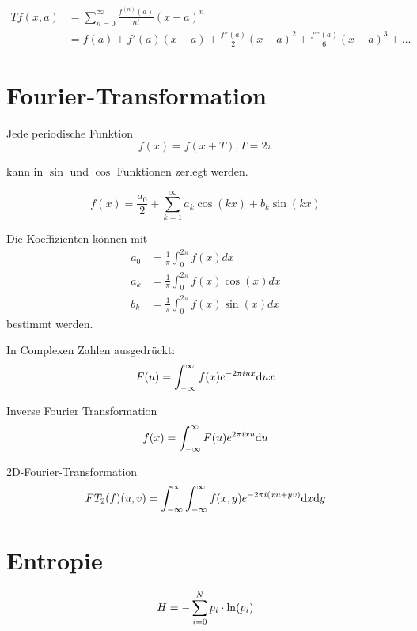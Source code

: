 \documentclass[a4paper]{scrartcl}
\begin{document}
\begin{align*}
  Tf(x, a) &= \sum_{n=0}^\infty \frac{f^{(n)}(a)}{n!}(x-a)^n
\\
  &= f(a) + f'(a)(x-a) + \frac{f''(a)}{2}(x-a)^2 + \frac{f'''(a)}{6}(x-a)^3 + \dots
\end{align*}

\section{Fourier-Transformation}

Jede periodische Funktion
\[
  f(x) = f(x + T), T = 2\pi
\]

kann in $\sin$ und $\cos$ Funktionen zerlegt werden.

\[
  f(x) = \frac{a_0}{2} + \sum_{k=1}^\infty a_k \cos(kx) + b_k \sin(kx)
\]

Die Koeffizienten können mit
\begin{align*}
  a_0 &= \frac{1}{\pi} \int_0^{2\pi} f(x) dx \\
  a_k &= \frac{1}{\pi} \int_0^{2\pi} f(x) \cos(x) dx \\
  b_k &= \frac{1}{\pi} \int_0^{2\pi} f(x) \sin(x)dx
\end{align*}
bestimmt werden.

In Complexen Zahlen ausgedrückt:
\[
  F(u) = \int_{-\infty}^\infty f(x) e^{-2 \pi i u x} {\mathord{\rm {d}}}ux
\]

Inverse Fourier Transformation
\[
  f(x) = \int_{-\infty}^\infty F(u) e^{2 \pi i x u} {\mathord{\rm {d}}}u
\]

2D-Fourier-Transformation
\[
  FT_2(f)(u, v) = \int_{-\infty}^{\infty} \int_{-\infty}^{\infty} f(x,y)e^{-2 \pi i (xu+yv)}{\mathord{\rm {d}}}x{\mathord{\rm {d}}}y
\]

\section{Entropie}

\[
  H = - \sum_{i=0}^N p_i \cdot {\mathord{\rm {ln}}}(p_i)
\]
\end{document}
